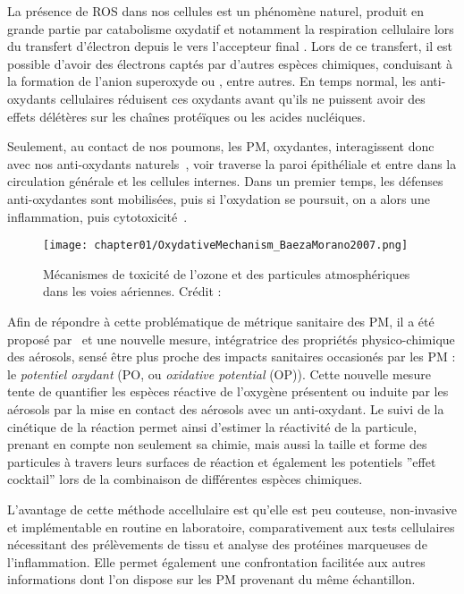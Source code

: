 La présence de ROS dans nos cellules est un phénomène naturel, produit en grande partie
par catabolisme oxydatif et notamment la respiration cellulaire lors du transfert
d'électron depuis le  vers l'accepteur final . Lors de ce transfert, il est
possible d'avoir des électrons captés par d'autres espèces chimiques, conduisant à la
formation de l'anion superoxyde  ou , entre autres.
En temps normal, les anti-oxydants cellulaires réduisent ces oxydants avant qu'ils ne
puissent avoir des effets délétères sur les chaînes protéïques ou les acides nucléiques.

Seulement, au contact de nos poumons, les PM, oxydantes, interagissent donc avec nos
anti-oxydants naturels~\autocite{kellyProtein2003}, voir traverse la paroi épithéliale
et entre dans la circulation générale et les cellules internes.
Dans un premier temps, les défenses anti-oxydantes sont mobilisées, puis si l'oxydation se
poursuit, on a alors une inflammation, puis cytotoxicité~\autocite{baezaPollution2007}.

\begin{figure}[ht]
    \centering
    \texttt{[image: chapter01/OxydativeMechanism\_BaezaMorano2007.png]}
    \caption{Mécanismes de toxicité de l’ozone et des particules atmosphériques dans les voies
    aériennes. Crédit : \textcite[figure 1]{baezaPollution2007}}%
    \label{fig:mecanisme_oxydation}
\end{figure}

Afin de répondre à cette problématique de métrique sanitaire des PM, il a été proposé
par~\textcite{zielinskiModeling1999} et \textcite{choRedox2005} une nouvelle mesure,
intégratrice des propriétés physico-chimique des aérosols, sensé être plus proche des
impacts sanitaires occasionés par les PM : le \textit{potentiel oxydant} (PO, ou
\textit{oxidative potential} (OP)).
Cette nouvelle mesure tente de quantifier les espèces réactive de l'oxygène présentent
ou induite par les aérosols par la mise en contact des aérosols avec un anti-oxydant.
Le suivi de la cinétique de la réaction permet ainsi d'estimer la réactivité de la
particule, prenant en compte non seulement sa chimie, mais aussi la taille et forme des
particules à travers leurs surfaces de réaction et également les potentiels ''effet
cocktail'' lors de la combinaison de différentes espèces chimiques.

L'avantage de cette méthode accellulaire est qu'elle est peu couteuse, non-invasive et
implémentable en routine en laboratoire, comparativement aux tests cellulaires nécessitant
des prélèvements de tissu et analyse des protéines marqueuses de l'inflammation.
Elle permet également une confrontation facilitée aux autres informations dont l'on dispose
sur les PM provenant du même échantillon.

